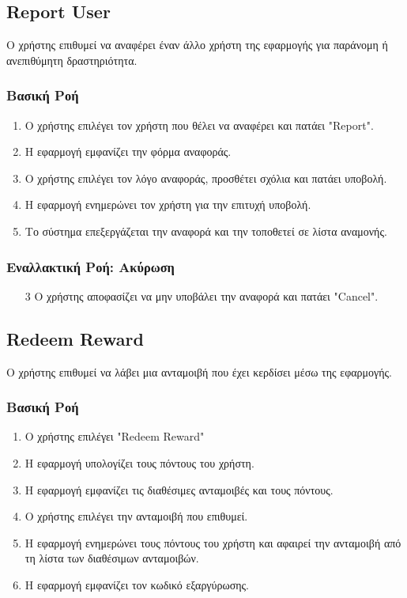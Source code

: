 \subsection{Report User}

Ο χρήστης επιθυμεί να αναφέρει έναν άλλο χρήστη της εφαρμογής για
παράνομη ή ανεπιθύμητη δραστηριότητα.

\subsubsection{Βασική Ροή}

\begin{enumerate}
    \item Ο χρήστης επιλέγει τον χρήστη που θέλει να αναφέρει και πατάει "Report".
    \item H εφαρμογή εμφανίζει την φόρμα αναφοράς.
    \item Ο χρήστης επιλέγει τον λόγο αναφοράς, προσθέτει σχόλια και πατάει υποβολή.
    \item Η εφαρμογή ενημερώνει τον χρήστη για την επιτυχή υποβολή.
    \item Το σύστημα επεξεργάζεται την αναφορά και την τοποθετεί σε λίστα αναμονής.
\end{enumerate}

\subsubsection{Εναλλακτική Ροή: Ακύρωση}

\begin{enumerate}
    \item[3] Ο χρήστης αποφασίζει να μην υποβάλει την αναφορά και πατάει "Cancel".
\end{enumerate}


\subsection{Redeem Reward}

Ο χρήστης επιθυμεί να λάβει μια ανταμοιβή που έχει κερδίσει μέσω
της εφαρμογής.

\subsubsection{Βασική Ροή}

\begin{enumerate}
    \item Ο χρήστης επιλέγει "Redeem Reward"
    \item Η εφαρμογή υπολογίζει τους πόντους του χρήστη.
    \item Η εφαρμογή εμφανίζει τις διαθέσιμες ανταμοιβές και τους πόντους.
    \item Ο χρήστης επιλέγει την ανταμοιβή που επιθυμεί.
    \item Η εφαρμογή ενημερώνει τους πόντους του χρήστη και αφαιρεί την ανταμοιβή
          από τη λίστα των διαθέσιμων ανταμοιβών.
    \item Η εφαρμογή εμφανίζει τον κωδικό εξαργύρωσης.
\end{enumerate}

